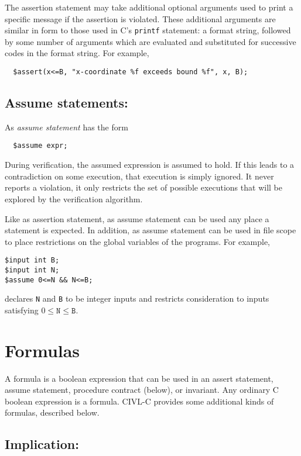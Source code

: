 The assertion statement may take additional optional arguments
used to print a specific message if the assertion is violated.
These additional arguments are similar in form to those used
in C's \texttt{printf} statement: a format string, followed by
some number of arguments which are evaluated and substituted
for successive codes in the format string.  For example,
\begin{verbatim}
  $assert(x<=B, "x-coordinate %f exceeds bound %f", x, B); 
\end{verbatim}


\subsection{Assume statements: \cassume}

As \emph{assume statement} has the form
\begin{verbatim}
  $assume expr;
\end{verbatim}
During verification, the assumed expression is assumed to hold.  If
this leads to a contradiction on some execution, that execution is
simply ignored.  It never reports a violation, it only restricts the
set of possible executions that will be explored by the verification
algorithm.

Like as assertion statement, as assume statement can be used any place
a statement is expected.  In addition, as assume statement can be used
in file scope to place restrictions on the global variables of the
programs.  For example,
\begin{verbatim}
$input int B;
$input int N;
$assume 0<=N && N<=B;
\end{verbatim}
declares \texttt{N} and \texttt{B} to be integer inputs and restricts
consideration to inputs satisfying $0\leq\texttt{N}\leq\texttt{B}$.


\section{Formulas}

A formula is a boolean expression that can be used in an assert
statement, assume statement, procedure contract (below), or invariant.
Any ordinary C boolean expression is a formula. CIVL-C provides some
additional kinds of formulas, described below.

\subsection{Implication: \cimplies}

